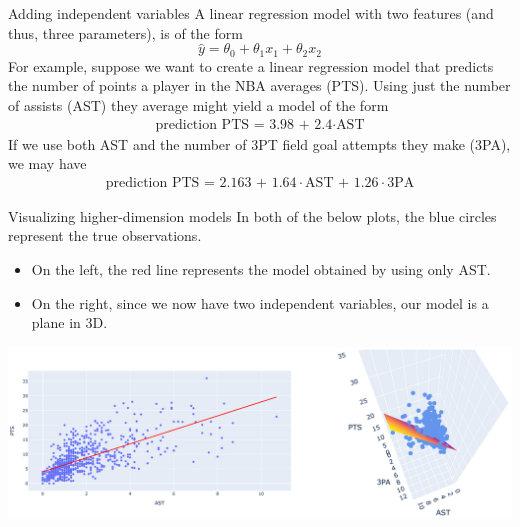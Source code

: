 \documentclass[aspectratio=169]{../latex_main/tntbeamer}  %
\begin{document}
	
	\begin{frame}{Adding independent variables}
	    A linear regression model with two features (and thus, three parameters), is of the form
        \begin{equation*}
            \hat{y} = \theta_0 + \theta_1x_1 + \theta_2x_2 
        \end{equation*}
        For example, suppose we want to create a linear regression model that predicts the number of points a player in the NBA averages (PTS). Using just the number of assists (AST) they average might yield a model of the form
        \begin{align*}
            \text{prediction PTS = 3.98 + 2.4} \cdot \text{AST}
        \end{align*}
        If we use both AST and the number of 3PT field goal attempts they make (3PA), we may have
        \begin{align*}
            \text{prediction PTS = 2.163 + 1.64} \cdot \text{AST + 1.26} \cdot 3\text{PA}
        \end{align*}

	\end{frame}
	
	
	\begin{frame}{Visualizing higher-dimension models}
	    In both of the below plots, the blue circles represent the true observations. 
        \begin{itemize}
            \item On the left, the red line represents the model obtained by using only AST.
            \item On the right, since we now have two independent variables, our model is a plane in 3D.
        \end{itemize}
        \includegraphics[scale=.4]{Bild10}
	\end{frame}
	
	
	
\end{document}
